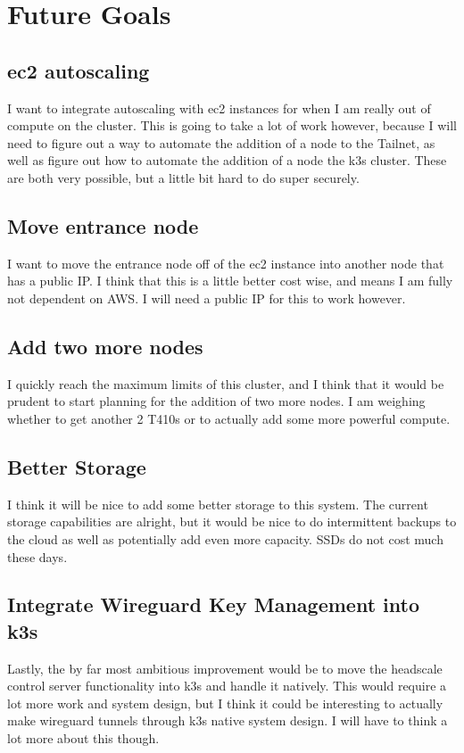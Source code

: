 \documentclass[12pt]{article}
\begin{document}
\section{Future Goals}
\subsection{ec2 autoscaling}
I want to integrate autoscaling with ec2 instances for when I am really out of compute on the cluster. This is going to take a lot of work however, because I will need to figure out a way to automate the addition of a node to the Tailnet, as well as figure out how to automate the addition of a node the k3s cluster. These are both very possible, but a little bit hard to do super securely.

\subsection{Move entrance node}
I want to move the entrance node off of the ec2 instance into another node that has a public IP. I think that this is a little better cost wise, and means I am fully not dependent on AWS. I will need a public IP for this to work however.

\subsection{Add two more nodes}
I quickly reach the maximum limits of this cluster, and I think that it would be prudent to start planning for the addition of two more nodes. I am weighing whether to get another 2 T410s or to actually add some more powerful compute.

\subsection{Better Storage}
I think it will be nice to add some better storage to this system. The current storage capabilities are alright, but it would be nice to do intermittent backups to the cloud as well as potentially add even more capacity. SSDs do not cost much these days.

\subsection{Integrate Wireguard Key Management into k3s}
Lastly, the by far most ambitious improvement would be to move the headscale control server functionality into k3s and handle it natively. This would require a lot more work and system design, but I think it could be interesting to actually make wireguard tunnels through k3s native system design. I will have to think a lot more about this though.
\end{document}
